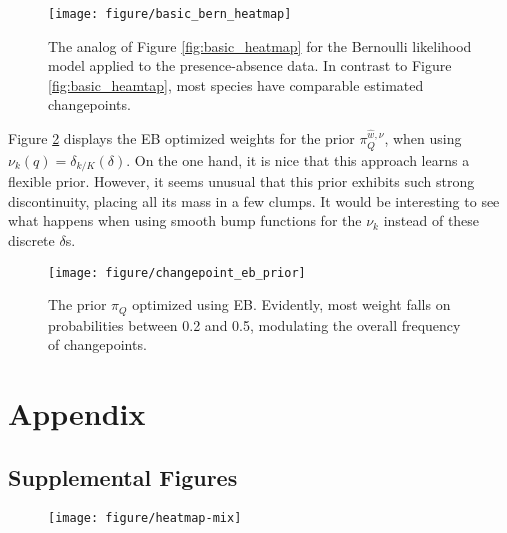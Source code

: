 \documentclass[14pt]{extarticle}
\begin{document}
\begin{figure}
  \centering
  \texttt{[image: figure/basic\_bern\_heatmap]}
  \caption{
    The analog of Figure \ref{fig:basic_heatmap} for the Bernoulli likelihood
    model applied to the presence-absence data. In contrast to Figure
    \ref{fig:basic_heamtap}, most species have comparable estimated
    changepoints.
    \label{fig:basic_bern_heatmap}
  }
\end{figure}

Figure \ref{fig:changepoint_eb_prior} displays the EB optimized weights for the
prior $\pi_{Q}^{\hat{w}, \nu}$, when using $\nu_{k}\left(q\right) = \delta_{k /
  K}\left(\delta\right)$. On the one hand, it is nice that this approach
learns a flexible prior. However, it seems unusual that this prior exhibits such
strong discontinuity, placing all its mass in a few clumps. It would be
interesting to see what happens when using smooth bump functions for the $\nu_k$
instead of these discrete $\delta$s.

\begin{figure}
  \centering
  \texttt{[image: figure/changepoint\_eb\_prior]}
  \caption{The prior $\pi_{Q}$ optimized using EB. Evidently, most weight falls
    on probabilities between 0.2 and 0.5, modulating the overall frequency of
    changepoints.
    \label{fig:changepoint_eb_prior} }
\end{figure}






\section{Appendix}
\label{sec:appendix}

\subsection{Supplemental Figures}
\label{subsec:supplemental_figures}

\begin{figure}
  \centering
  \texttt{[image: figure/heatmap-mix]}
  \caption{\label{fig:heatmap-mix} }
\end{figure}
\end{document}

